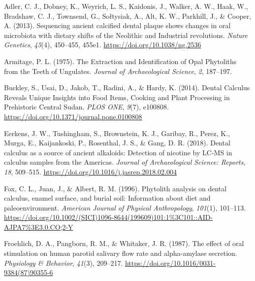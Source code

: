 \documentclass[
  letterpaper,
]{book}
\newlength{\cslhangindent}
\newlength{\cslentryspacingunit} %
\newenvironment{CSLReferences}[2] %
 {%
  \setlength{\parindent}{0pt}
  \ifodd #1
  \let\oldpar\par
  \def\par{\hangindent=\cslhangindent\oldpar}
  \fi
  \setlength{\parskip}{#2\cslentryspacingunit}
 }%
 {}
\begin{document}
\hypertarget{refs-5}{}
\begin{CSLReferences}{1}{0}
\leavevmode{}%
Adler, C. J., Dobney, K., Weyrich, L. S., Kaidonis, J., Walker, A. W.,
Haak, W., Bradshaw, C. J., Townsend, G., Sołtysiak, A., Alt, K. W.,
Parkhill, J., \& Cooper, A. (2013). Sequencing ancient calcified dental
plaque shows changes in oral microbiota with dietary shifts of the
{Neolithic} and {Industrial} revolutions. \emph{Nature Genetics},
\emph{45}(4), 450--455, 455e1. \url{https://doi.org/10.1038/ng.2536}

\leavevmode{}%
Armitage, P. L. (1975). The {Extraction} and {Identification} of {Opal
Phytoliths} from the {Teeth} of {Ungulates}. \emph{Journal of
Archaeological Science}, \emph{2}, 187--197.

\leavevmode{}%
Buckley, S., Usai, D., Jakob, T., Radini, A., \& Hardy, K. (2014).
Dental {Calculus Reveals Unique Insights} into {Food Items}, {Cooking}
and {Plant Processing} in {Prehistoric Central Sudan}. \emph{PLOS ONE},
\emph{9}(7), e100808. \url{https://doi.org/10.1371/journal.pone.0100808}

\leavevmode{}%
Eerkens, J. W., Tushingham, S., Brownstein, K. J., Garibay, R., Perez,
K., Murga, E., Kaijankoski, P., Rosenthal, J. S., \& Gang, D. R. (2018).
Dental calculus as a source of ancient alkaloids: {Detection} of
nicotine by {LC-MS} in calculus samples from the {Americas}.
\emph{Journal of Archaeological Science: Reports}, \emph{18}, 509--515.
\url{https://doi.org/10.1016/j.jasrep.2018.02.004}

\leavevmode{}%
Fox, C. L., Juan, J., \& Albert, R. M. (1996). Phytolith analysis on
dental calculus, enamel surface, and burial soil: {Information} about
diet and paleoenvironment. \emph{American Journal of Physical
Anthropology}, \emph{101}(1), 101--113.
\url{https://doi.org/10.1002/(SICI)1096-8644(199609)101:1\%3C101::AID-AJPA7\%3E3.0.CO;2-Y}

\leavevmode{}%
Froehlich, D. A., Pangborn, R. M., \& Whitaker, J. R. (1987). The effect
of oral stimulation on human parotid salivary flow rate and
alpha-amylase secretion. \emph{Physiology \& Behavior}, \emph{41}(3),
209--217. \url{https://doi.org/10.1016/0031-9384(87)90355-6}


\end{CSLReferences}
\end{document}

